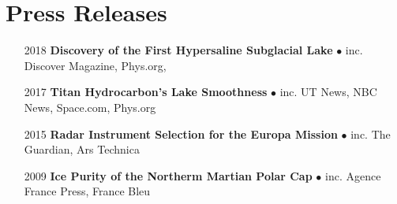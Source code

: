 \section*{Press Releases}

\begin{itemize}[leftmargin=3.8em, labelsep=1.5em]
    \setlength\itemsep{-.5em}
    \item[2018] \textbf{Discovery of the First Hypersaline Subglacial Lake} $\bullet$ inc. Discover Magazine, Phys.org, 
    \item[2017] \textbf{Titan Hydrocarbon's Lake Smoothness} $\bullet$ inc. UT News, NBC News, Space.com, Phys.org
    \item[2015] \textbf{Radar Instrument Selection for the Europa Mission} $\bullet$ inc. The Guardian, Ars Technica
    \item[2009] \textbf{Ice Purity of the Northerm Martian Polar Cap} $\bullet$ inc. Agence France Press, France Bleu
\end{itemize}